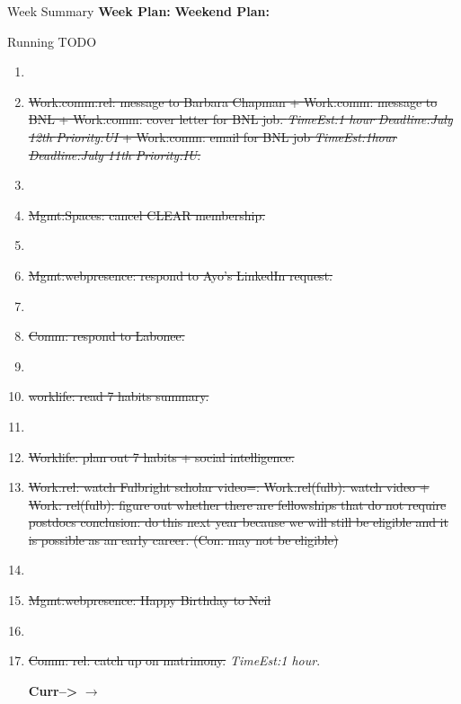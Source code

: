 \documentclass[serif, mathserif, final]{beamer}
\newcommand{\doneTask}[1]{\tiny \item \tiny \sout{#1}}
\newcommand{\te}[1]{\textit{TimeEst:}\textit{#1}}
\newcommand{\dl}[1]{\textit{Deadline:}\textit{#1}}
\newcommand{\pr}[1]{\textit{Priority:}\textit{#1}}
\begin{document}
\begin{frame}
\begin{columns}
\begin{column}{0.5\linewidth}

      \begin{block}{Week Summary}
        {\tiny \textbf{Week Plan:}   }
        {\tiny \textbf{Weekend Plan:}  }   
      \end{block}

      \begin{block}{Running TODO} %
        \begin{enumerate} 

        \item \tiny \doneTask{Work:comm:rel: message to Barbara Chapman +
          Work:comm: message to BNL +  Work:comm: cover letter for BNL job. \te{1 hour}
          \dl{July 12th} \pr{UI} + Work:comm: email for BNL job \te{1hour} \dl{July 11th}
          \pr{IU}. }

        \item \tiny \doneTask{Mgmt:Spaces: cancel CLEAR membership. }

        \item \tiny \doneTask{Mgmt:webpresence: respond to Ayo's
          LinkedIn request.} 

        \item \tiny \doneTask{Comm: respond to Labonee.}

        \item \tiny \doneTask{worklife: read 7 habits summary. }
        \item \tiny \doneTask {Worklife: plan out 7 habits + social
          intelligence.}

        \doneTask{ Work:rel: watch Fulbright scholar video=: Work:rel(fulb): watch video + Work: rel(fulb): figure out whether there are fellowships
          that do not require postdocs 
          conclusion: do this next year because we will still be
          eligible and it is possible as an early career. (Con: may
          not be eligible) } 

        \item \tiny \doneTask{ Mgmt:webpresence: Happy Birthday to
          Neil }  
        \item \tiny \doneTask{Comm: rel: catch up on matrimony.} \te{1 hour}. 
        
        \textbf{Curr-->} $\rightarrow$ 


\end{enumerate}
\end{block}
\end{column}
\end{columns}
\end{frame}
\end{document}
